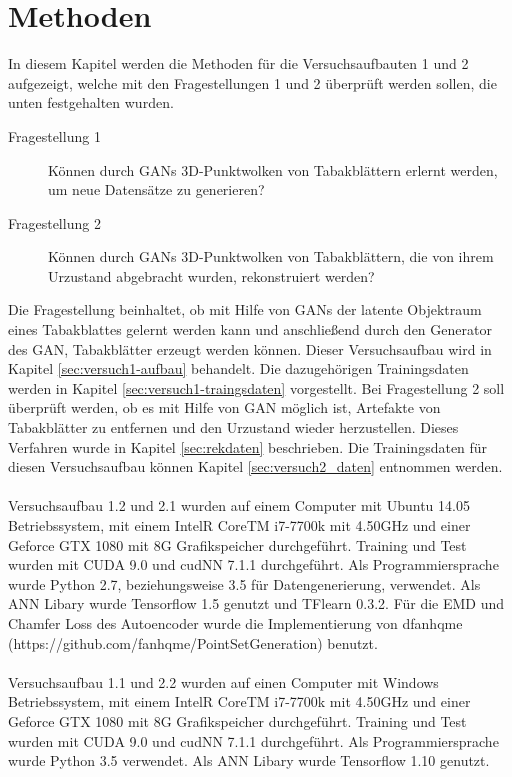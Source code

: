 \documentclass{llncs}
\begin{document}
\section{Methoden}
In diesem Kapitel werden die Methoden für die Versuchsaufbauten 1 und 2 aufgezeigt, welche mit den Fragestellungen 1 und 2 überprüft werden sollen, die unten festgehalten wurden.
\begin{description}
	\item[Fragestellung 1]
	Können durch GANs 3D-Punktwolken von Tabakblättern erlernt werden, um neue Datensätze zu generieren?\\
	
	\item[Fragestellung 2] Können durch GANs 3D-Punktwolken von Tabakblättern, die von ihrem Urzustand abgebracht wurden, rekonstruiert werden? 
\end{description}
Die Fragestellung beinhaltet, ob mit Hilfe von GANs der latente Objektraum eines Tabakblattes gelernt werden kann und anschließend durch den Generator des GAN, Tabakblätter erzeugt werden können. Dieser Versuchsaufbau wird in Kapitel \ref{sec:versuch1-aufbau} behandelt. Die dazugehörigen Trainingsdaten werden in Kapitel \ref{sec:versuch1-traingsdaten} vorgestellt. Bei Fragestellung 2 soll überprüft werden, ob es mit Hilfe von GAN möglich ist, Artefakte von Tabakblätter zu entfernen und den Urzustand wieder herzustellen.  Dieses Verfahren wurde in Kapitel \ref{sec:rekdaten} beschrieben. Die Trainingsdaten für diesen Versuchsaufbau können Kapitel \ref{sec:versuch2_daten} entnommen werden. 
\\\\
Versuchsaufbau 1.2 und 2.1 wurden auf einem Computer mit Ubuntu 14.05 Betriebssystem, mit einem IntelR CoreTM i7-7700k mit 4.50GHz und einer Geforce GTX 1080 mit 8G Grafikspeicher durchgeführt. Training und Test  wurden mit CUDA 9.0 und cudNN 7.1.1 durchgeführt. Als Programmiersprache wurde Python 2.7, beziehungsweise 3.5 für Datengenerierung, verwendet. Als ANN Libary wurde Tensorflow 1.5 genutzt und TFlearn 0.3.2. Für die EMD und Chamfer Loss des Autoencoder wurde die Implementierung von dfanhqme (https://github.com/fanhqme/PointSetGeneration) benutzt.
\\\\
Versuchsaufbau 1.1 und 2.2  wurden auf einen Computer mit Windows Betriebssystem, mit einem IntelR CoreTM i7-7700k mit 4.50GHz und einer Geforce GTX 1080 mit 8G Grafikspeicher durchgeführt. Training und Test wurden mit CUDA 9.0 und cudNN 7.1.1 durchgeführt. Als Programmiersprache wurde Python 3.5 verwendet. Als ANN Libary wurde Tensorflow 1.10 genutzt.
\newpage
\end{document}
